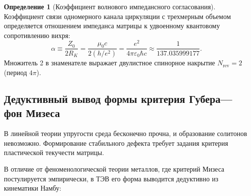 \documentclass[11pt,a4paper]{article}
\theoremstyle{definition}
\newtheorem{definition}{Определение}
\theoremstyle{remark}
\begin{document}
\begin{definition}[Коэффициент волнового импедансного согласования]
Коэффициент связи одномерного канала циркуляции с трехмерным объемом определяется отношением импеданса матрицы к удвоенному квантовому сопротивлению вихря:
\begin{equation}
\alpha \equiv \frac{Z_0}{2 R_K} = \frac{\mu_0 c}{2 (h/e^2)} = \frac{e^2}{4\pi \varepsilon_0 \hbar c} \approx \frac{1}{137.035999177}.
\label{eq:alpha_def}
\end{equation}
Множитель 2 в знаменателе выражает двулистное спинорное накрытие $N_{\mathrm{rev}} = 2$ (период $4\pi$).
\end{definition}

\subsection{Дедуктивный вывод формы критерия Губера---фон Мизеса}

В линейной теории упругости среда бесконечно прочна, и образование солитонов невозможно. Формирование стабильного дефекта требует задания критерия пластической текучести матрицы.

В отличие от феноменологической теории металлов, где критерий Мизеса постулируется эмпирически, в ТЭВ его форма выводится дедуктивно из кинематики Намбу:
\end{document}
